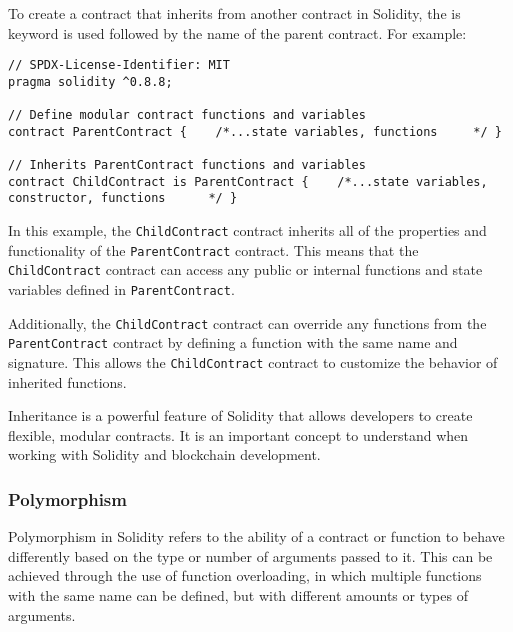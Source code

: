 \documentclass{article}
\theoremstyle{theorem}
\theoremstyle{definition}
\theoremstyle{remark}
\begin{document}
\medskip\noindent
To create a contract that inherits from another contract in Solidity, the \colorbox{Gainsboro!60!Lavender}{is} keyword is used followed by the name of the parent contract. For example:
\medskip\noindent

\begin{itemize}
\begin{lstlisting}
// SPDX-License-Identifier: MIT
pragma solidity ^0.8.8;

// Define modular contract functions and variables 
contract ParentContract {    /*...state variables, functions     */ }

// Inherits ParentContract functions and variables
contract ChildContract is ParentContract {    /*...state variables, constructor, functions      */ }
\end{lstlisting}

\end{itemize}

\medskip\noindent
In this example, the \texttt{ChildContract} contract inherits all of the properties and functionality of the \texttt{ParentContract} contract. This means that the \texttt{ChildContract} contract can access any public or internal functions and state variables defined in \texttt{ParentContract}.

\medskip\noindent
Additionally, the \texttt{ChildContract} contract can override any functions from the \texttt{ParentContract} contract by defining a function with the same name and signature. This allows the \texttt{ChildContract} contract to customize the behavior of inherited functions.

\medskip\noindent
Inheritance is a powerful feature of Solidity that allows developers to create flexible, modular contracts. It is an important concept to understand when working with Solidity and blockchain development.


\subsubsection{Polymorphism} \label{poly}

Polymorphism in Solidity refers to the ability of a contract or function to behave differently based on the type or number of arguments passed to it. This can be achieved through the use of function overloading, in which multiple functions with the same name can be defined, but with different amounts or types of arguments. 
\end{document}
